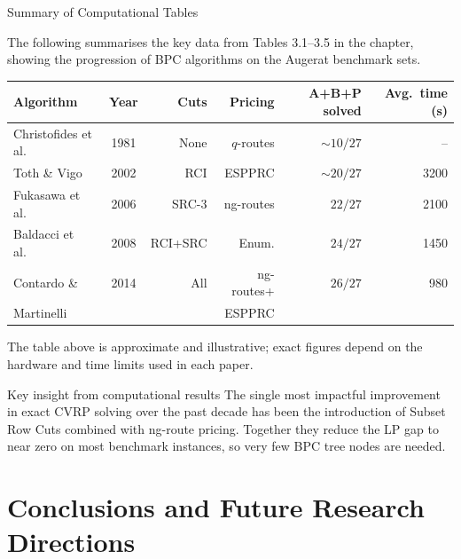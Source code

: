 \documentclass[aspectratio=169,10pt]{beamer}
\begin{document}
\begin{frame}[allowframebreaks]{Summary of Computational Tables}

The following summarises the key data from Tables 3.1--3.5 in the chapter,
showing the progression of BPC algorithms on the Augerat benchmark sets.

\begin{center}
\begin{tabular}{lcrrrr}
\toprule
\textbf{Algorithm} & \textbf{Year} &
\textbf{Cuts} & \textbf{Pricing} &
\textbf{A+B+P solved} & \textbf{Avg.\ time (s)} \\
\midrule
Christofides et al.\ & 1981 & None     & $q$-routes     & $\sim 10/27$ & --   \\
Toth \& Vigo         & 2002 & RCI      & ESPPRC         & $\sim 20/27$ & 3200 \\
Fukasawa et al.\     & 2006 & SRC-3    & ng-routes      & $22/27$      & 2100 \\
Baldacci et al.\     & 2008 & RCI+SRC  & Enum.          & $24/27$      & 1450 \\
Contardo \&          & 2014 & All      & ng-routes+     & $26/27$      & 980  \\
\quad Martinelli     &      &          & \quad ESPPRC   &              &      \\
\bottomrule
\end{tabular}
\end{center}

\vspace{0.5em}
The table above is approximate and illustrative; exact figures depend on
the hardware and time limits used in each paper.

\begin{alertblock}{Key insight from computational results}
The single most impactful improvement in exact CVRP solving over the
past decade has been the introduction of Subset Row Cuts combined with
ng-route pricing. Together they reduce the LP gap to near zero on most
benchmark instances, so very few BPC tree nodes are needed.
\end{alertblock}

\end{frame}

\section{Conclusions and Future Research Directions}
\end{document}
